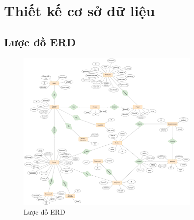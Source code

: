 \section{Thiết kế cơ sở dữ liệu}
\subsection{Lược đồ ERD}
\begin{figure}[H]
        \centering
        \includegraphics[width=0.8\textwidth]{Content/Phân tích và thiết kế hệ thống/images/erd2-resize.png}
        \vspace{0.5cm}
        \caption{Lược đồ ERD}
        \label{fig:Lược đồ ERD}
\end{figure}

